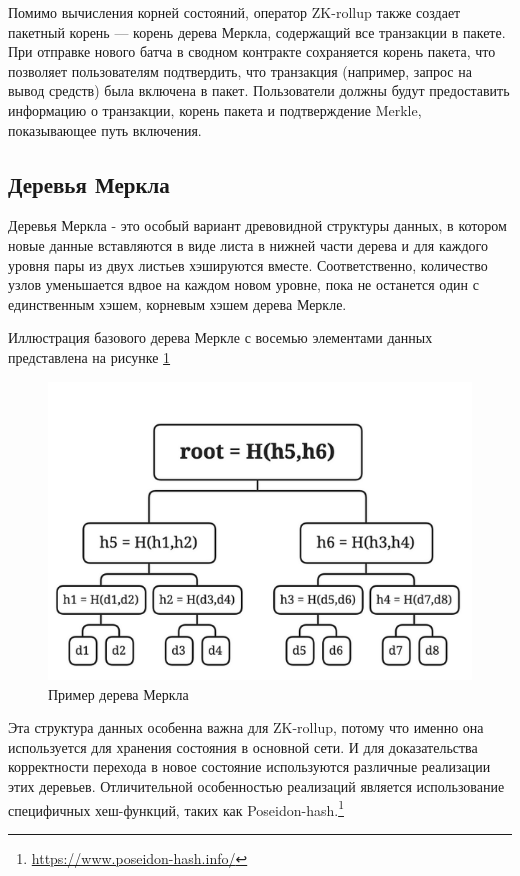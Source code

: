 \documentclass[a4paper]{article}
\begin{document}
Помимо вычисления корней состояний, оператор ZK-rollup также создает пакетный корень — корень дерева Меркла, содержащий все транзакции в пакете. При отправке нового батча в сводном контракте сохраняется корень пакета, что позволяет пользователям подтвердить, что транзакция (например, запрос на вывод средств) была включена в пакет. Пользователи должны будут предоставить информацию о транзакции, корень пакета и подтверждение Merkle, показывающее путь включения.

\subsection{Деревья Меркла}
\indent

Деревья Меркла - это особый вариант древовидной структуры данных, в котором новые данные вставляются в виде листа в нижней части дерева и для каждого уровня пары из двух листьев хэшируются вместе. Соответственно, количество узлов уменьшается вдвое на каждом новом уровне, пока не останется один с единственным хэшем, корневым хэшем дерева Меркле.

Иллюстрация базового дерева Меркле с восемью элементами данных представлена на рисунке \ref{Merkle_tree}

\begin{figure}[ht!]
\includegraphics[width=180mm]{Merkle_tree.png}
\caption{Пример дерева Меркла}
\label{Merkle_tree}
\end{figure}

Эта структура данных особенна важна для ZK-rollup, потому что именно она используется для хранения состояния в основной сети. И для доказательства корректности перехода в новое состояние используются различные реализации этих деревьев. Отличительной особенностью реализаций является использование специфичных хеш-функций, таких как Poseidon-hash.\footnote[1]{\href{https://www.poseidon-hash.info/}{https://www.poseidon-hash.info/}}
\end{document}
